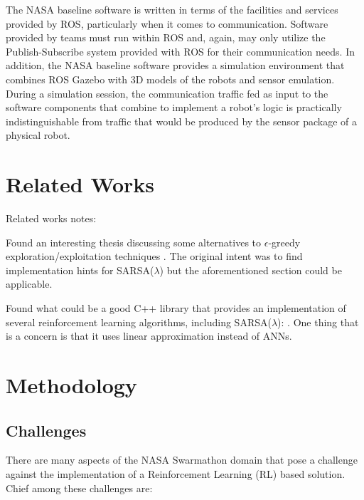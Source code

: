 \documentclass[sigconf,authordraft]{acmart}
\begin{document}
The NASA baseline software is written in terms of the facilities and services
provided by ROS, particularly when it comes to communication. Software provided
by teams must run within ROS and, again, may only utilize the Publish-Subscribe
system provided with ROS for their communication needs. In addition, the NASA
baseline software provides a simulation environment that combines ROS Gazebo
with 3D models of the robots and sensor emulation. During a simulation session,
the communication traffic fed as input to the software components that combine
to implement a robot's logic is practically indistinguishable from traffic that
would be produced by the sensor package of a physical robot.

\section{Related Works}\label{sec:related_works}
Related works notes:

Found an interesting thesis discussing some alternatives to $\epsilon$-greedy exploration/exploitation techniques \cite[pp. 54]{nissen2007large}. The original intent was to find implementation hints for SARSA($\lambda$) but the aforementioned section could be applicable.

Found what could be a good C++ library that provides an implementation of several reinforcement learning algorithms, including SARSA($\lambda$): \cite[RLLib]{samindaa-rllib}. One thing that is a concern is that it uses linear approximation instead of ANNs.

\section{Methodology}\label{sec:methodology}

\subsection{Challenges}\label{subsec:challenges}
There are many aspects of the NASA Swarmathon domain that pose a challenge against the implementation of a Reinforcement Learning (RL) based solution. Chief among these challenges are:
\end{document}

